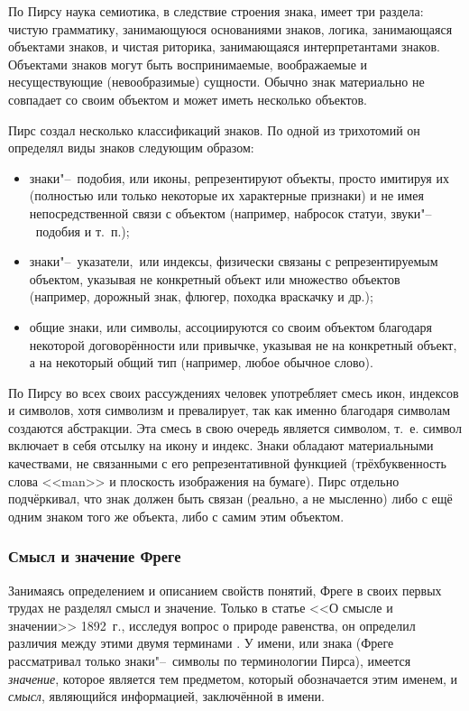 \documentclass[a4paper,12pt]{article}
\begin{document}
	По Пирсу наука семиотика, в следствие строения знака, имеет три раздела: чистую грамматику, занимающуюся основаниями знаков, логика, занимающаяся объектами знаков, и чистая риторика, занимающаяся интерпретантами знаков. Объектами знаков могут быть воспринимаемые, воображаемые и несуществующие (невообразимые) сущности. Обычно знак материально не совпадает со своим объектом и может иметь несколько объектов.
	
	Пирс создал несколько классификаций знаков. По одной из трихотомий он определял виды знаков следующим образом:
	\begin{itemize}
		\item знаки"--~подобия, или иконы, репрезентируют объекты, просто имитируя их (полностью или только некоторые их характерные признаки) и не имея непосредственной связи с объектом (например, набросок статуи, звуки"--~подобия и т.~п.);
		\item знаки"--~указатели,~или индексы, физически связаны с репрезентируемым объектом, указывая не  конкретный объект или множество объектов (например, дорожный знак, флюгер, походка враскачку и др.);
		\item общие знаки, или символы, ассоциируются со своим объектом благодаря некоторой договорённости или привычке, указывая не на конкретный объект, а на некоторый общий тип (например, любое обычное слово).
	\end{itemize}
	
	По Пирсу во всех своих рассуждениях человек употребляет смесь икон, индексов и символов, хотя символизм и превалирует, так как именно благодаря символам создаются абстракции. Эта смесь в свою очередь является символом, т.~е. символ включает в себя отсылку на икону и индекс. Знаки обладают материальными качествами, не связанными с его репрезентативной функцией (трёхбуквенность слова <<man>> и плоскость изображения на бумаге). Пирс отдельно подчёркивал, что знак должен быть связан (реально, а не мысленно) либо с ещё одним знаком того же объекта, либо с самим этим объектом.
	
	\subsubsection{Смысл и значение Фреге}
	
	Занимаясь определением и описанием свойств понятий, Фреге в своих первых трудах не разделял смысл и значение. Только в статье <<О смысле и значении>> 1892~г., исследуя вопрос о природе равенства, он определил различия между этими двумя терминами \cite{Frege2000, Birukov1960}. У имени, или знака (Фреге рассматривал только знаки"--~символы по терминологии Пирса), имеется \textit{значение}, которое является тем предметом, который обозначается этим именем, и \textit{смысл}, являющийся информацией, заключённой в имени.
	
\end{document}
